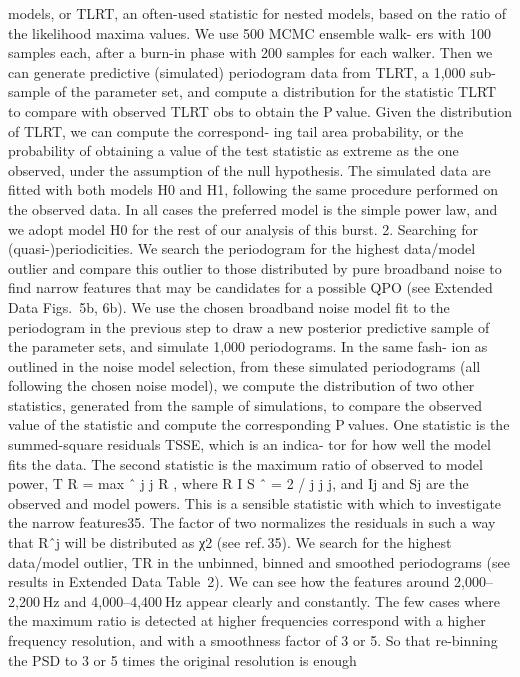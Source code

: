 models, or TLRT, an often-used statistic for nested models, based on the
ratio of the likelihood maxima values. We use 500 MCMC ensemble walk-
ers with 100 samples each, after a burn-in phase with 200 samples for
each walker. Then we can generate predictive (simulated) periodogram
data from TLRT, a 1,000 sub-sample of the parameter set, and compute a
distribution for the statistic TLRT to compare with observed TLRT
obs to obtain
the P value. Given the distribution of TLRT, we can compute the correspond-
ing tail area probability, or the probability of obtaining a value of the test
statistic as extreme as the one observed, under the assumption of the
null hypothesis. The simulated data are fitted with both models H0 and
H1, following the same procedure performed on the observed data.
In all cases the preferred model is the simple power law, and we adopt
model H0 for the rest of our analysis of this burst.
2. Searching for (quasi-)periodicities. We search the periodogram
for the highest data/model outlier and compare this outlier to those
distributed by pure broadband noise to find narrow features that may
be candidates for a possible QPO (see Extended Data Figs. 5b, 6b).
We use the chosen broadband noise model fit to the periodogram
in the previous step to draw a new posterior predictive sample of the
parameter sets, and simulate 1,000 periodograms. In the same fash-
ion as outlined in the noise model selection, from these simulated
periodograms (all following the chosen noise model), we compute
the distribution of two other statistics, generated from the sample of
simulations, to compare the observed value of the statistic and compute
the corresponding P values.
One statistic is the summed-square residuals TSSE, which is an indica-
tor for how well the model fits the data. The second statistic is the
maximum ratio of observed to model power, T
R
= max ˆ
j
j
R
, where
R
I
S
ˆ = 2 /
j
j
j, and Ij and Sj are the observed and model powers. This is a
sensible statistic with which to investigate the narrow features35.
The factor of two normalizes the residuals in such a way that Rˆj will be
distributed as χ2 (see ref. 35).
We search for the highest data/model outlier, TR in the unbinned,
binned and smoothed periodograms (see results in Extended Data
Table 2). We can see how the features around 2,000–2,200 Hz and
4,000–4,400 Hz appear clearly and constantly. The few cases where
the maximum ratio is detected at higher frequencies correspond with a
higher frequency resolution, and with a smoothness factor of 3 or 5. So
that re-binning the PSD to 3 or 5 times the original resolution is enough

